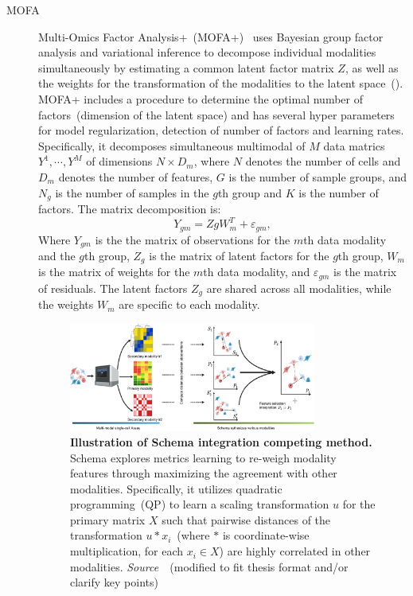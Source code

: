 \begin{description}
  \item[MOFA]
  Multi-Omics Factor Analysis+~(MOFA+)~\citep{argelaguet2020mofa+} uses Bayesian group factor analysis and variational inference to decompose individual modalities simultaneously by estimating a common latent factor matrix $Z$, as well as the weights for the transformation of the modalities to the latent space~(). MOFA+ includes a procedure to determine the optimal number of factors~(dimension of the latent space) and has several hyper parameters for model regularization, detection of number of factors and learning rates. Specifically, it decomposes simultaneous multimodal of $M$ data matrics $Y^1, \cdots, Y^M$ of dimensions $N\times D_m$, where $N$ denotes the number of cells and $D_m$ denotes the number of features, $G$ is the number of sample groups, and $N_g$ is the number of samples in the $g$th group and $K$ is the number of factors. The matrix decomposition is:
  \begin{equation}
  Y_{gm} = ZgW_m^{T} + \varepsilon_{gm},
  \end{equation}
  Where $Y_{gm}$ is the the matrix of observations for the $m$th data modality and the $g$th group, $Z_g$ is the matrix of latent factors for the $g$th group, $W_m$ is the matrix of weights for the $m$th data modality, and $\varepsilon_{gm}$ is the matrix of residuals. The latent factors $Z_g$ are shared across all modalities, while the weights $W_m$ are specific to each modality. %

\begin{figure}[!h]
  	\centering
  	\includegraphics[width=0.8\textwidth]{Alg_Schema/fig}
  	\vspace{0.1cm}
  	\caption[Illustration of Schema integration competing method.]{\textbf{Illustration of Schema integration competing method.} Schema explores metrics learning to re-weigh modality features through maximizing the agreement with other modalities. Specifically, it utilizes quadratic programming~(QP) to learn a scaling transformation $u$ for the primary matrix $X$ such that pairwise distances of the transformation $u * x_i$~(where $*$ is coordinate-wise multiplication, for each $x_i\in X$) are highly correlated in other modalities. \emph{Source~\cite{singh2021schema}}~(modified to fit thesis format and/or clarify key points)
 } 
  	\label{fig:Alg_Schema}
\end{figure} 


\end{description}
